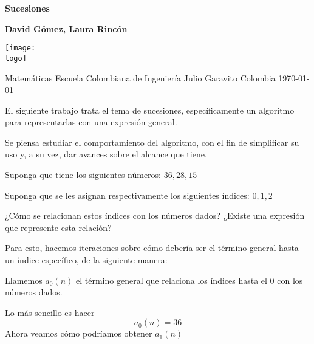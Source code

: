 \documentclass{article}
\newcommand{\logo}{"C:/Users/usuario/OneDrive/Documentos/U/logo-eci.jpg"}
\newcommand{\titlename}{Sucesiones}%
\renewcommand{\author}{{David Gómez, Laura Rincón}}
\begin{document}
\begin{titlepage}
    \begin{center}
        \vspace*{1cm}

        \textbf{\Huge{\titlename}}

        \vspace{1.5cm}

        \textbf{{\author}}

        \vspace{3cm}

        \texttt{[image: \\logo]}

        \vspace{3cm}

        Matemáticas\linebreak
        Escuela Colombiana de Ingeniería Julio Garavito\linebreak
        Colombia\linebreak
        \today

    \end{center}
\end{titlepage}
\clearpage
\tableofcontents
\clearpage


El siguiente trabajo trata el tema de sucesiones, específicamente un algoritmo para representarlas con una expresión general.

Se piensa estudiar el comportamiento del algoritmo, con el fin de simplificar su uso y, a su vez, dar avances sobre el alcance que tiene.

Suponga que tiene los siguientes números: $36, 28, 15$

Suponga que se les asignan respectivamente los siguientes índices: $0, 1, 2$

¿Cómo se relacionan estos índices con los números dados?
¿Existe una expresión que represente esta relación?

Para esto, hacemos iteraciones sobre cómo debería ser el término general hasta un índice específico, de la siguiente manera:

Llamemos $a_0(n)$ el término general que relaciona los índices hasta el $0$ con los números dados.

Lo más sencillo es hacer
\[a_0(n) = 36\]
Ahora veamos cómo podríamos obtener $a_1(n)$
\end{document}
